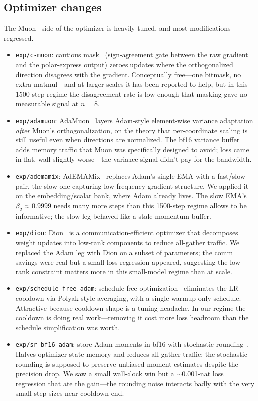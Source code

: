 \documentclass[10pt,letterpaper]{article}
\newcommand{\code}[1]{\texttt{\small #1}}
\begin{document}
\subsection{Optimizer changes}
The Muon~\cite{muon_jordan} side of the optimizer is heavily tuned, and most modifications regressed.
\begin{itemize}[leftmargin=1.2em,itemsep=4pt]
  \item \code{exp/c-muon}: cautious mask~\cite{cmuon} (sign-agreement gate between the raw gradient and the polar-express output) zeroes updates where the orthogonalized direction disagrees with the gradient. Conceptually free---one bitmask, no extra matmul---and at larger scales it has been reported to help, but in this 1500-step regime the disagreement rate is low enough that masking gave no measurable signal at $n=8$.
  \item \code{exp/adamuon}: AdaMuon~\cite{adamuon} layers Adam-style element-wise variance adaptation \emph{after} Muon's orthogonalization, on the theory that per-coordinate scaling is still useful even when directions are normalized. The bf16 variance buffer adds memory traffic that Muon was specifically designed to avoid; loss came in flat, wall slightly worse---the variance signal didn't pay for the bandwidth.
  \item \code{exp/ademamix}: AdEMAMix~\cite{ademamix} replaces Adam's single EMA with a fast/slow pair, the slow one capturing low-frequency gradient structure. We applied it on the embedding/scalar bank, where Adam already lives. The slow EMA's $\beta_2 \approx 0.9999$ needs many more steps than this 1500-step regime allows to be informative; the slow leg behaved like a stale momentum buffer.
  \item \code{exp/dion}: Dion~\cite{dion} is a communication-efficient optimizer that decomposes weight updates into low-rank components to reduce all-gather traffic. We replaced the Adam leg with Dion on a subset of parameters; the comm savings were real but a small loss regression appeared, suggesting the low-rank constraint matters more in this small-model regime than at scale.
  \item \code{exp/schedule-free-adam}: schedule-free optimization~\cite{schedfree} eliminates the LR cooldown via Polyak-style averaging, with a single warmup-only schedule. Attractive because cooldown shape is a tuning headache. In our regime the cooldown is doing real work---removing it cost more loss headroom than the schedule simplification was worth.
  \item \code{exp/sr-bf16-adam}: store Adam moments in bf16 with stochastic rounding~\cite{srbf16}. Halves optimizer-state memory and reduces all-gather traffic; the stochastic rounding is supposed to preserve unbiased moment estimates despite the precision drop. We saw a small wall-clock win but a $\sim$0.001-nat loss regression that ate the gain---the rounding noise interacts badly with the very small step sizes near cooldown end.

\end{itemize}
\end{document}
